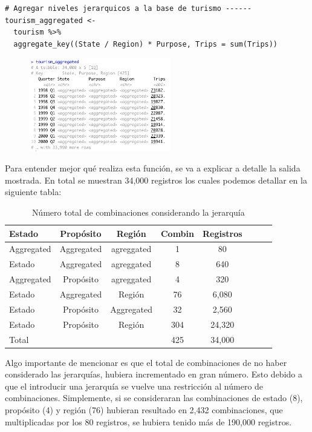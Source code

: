 \begin{lstlisting}
# Agregar niveles jerarquicos a la base de turismo ------
tourism_aggregated <- 
  tourism %>% 
  aggregate_key((State / Region) * Purpose, Trips = sum(Trips))
\end{lstlisting}

 \begin{figure}[!h]
 \centering
      \includegraphics[width=62mm]{imgs/13_aggregated.png}
      \label{fig:snowyplot}
    \end{figure}

\newpage 

Para entender mejor qué realiza esta función, se va a explicar a detalle la salida mostrada. En total se muestran 34,000 registros los cuales podemos detallar en la siguiente tabla:

\begin{table}[!h]
    \centering
    \begin{tabular}{p{2cm}|c|c|c|c|c|c|c}
    Estado  & Propósito & Región & Combin & Registros \\
    \hline
    \hline
    Aggregated & Aggregated &  agreggated  & 1 & 80\\
    Estado & Aggregated &  agreggated  & 8 & 640 \\
    Aggregated & Propósito &  agreggated  & 4 & 320  \\
    Estado & Aggregated & Región  & 76 & 6,080  \\
    Estado & Propósito & Aggregated  & 32 & 2,560  \\
    Estado & Propósito & Región  & 304 & 24,320  \\
    \hline
    Total &  &   & 425 & 34,000  \\
    \hline
    \end{tabular}
    \caption{Número total de combinaciones considerando la jerarquía}
    \label{tbl: res}
\end{table}

Algo importante de mencionar es que el total de combinaciones de no haber considerado las jerarquías, hubiera incrementado en gran número. Esto debido a que el introducir una jerarquía se vuelve una restricción al número de combinaciones. Simplemente, si se consideraran las combinaciones de estado (8), propósito (4) y región (76) hubieran resultado en 2,432 combinaciones, que multiplicadas por los 80 registros, se hubiera tenido más de 190,000 registros.


